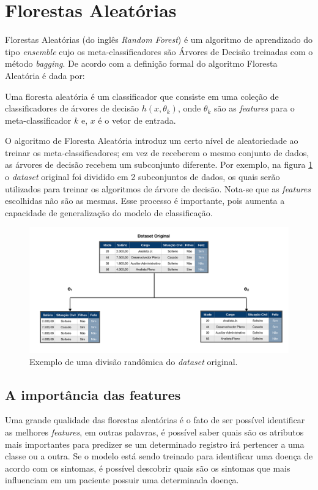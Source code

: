 \section{Florestas Aleatórias}
\label{sec:floresta}
Florestas Aleatórias (do inglês \textit{Random Forest}) é um algoritmo de aprendizado do tipo \textit{ensemble} cujo os meta-classificadores são Árvores de Decisão \cite{Quinlan:1986} treinadas com o método \textit{bagging}.
De acordo com \cite{breiman:2001} a definição formal do algoritmo Floresta Aleatória é dada por:

\begin{definition}\label{def:floresta}
Uma floresta aleatória é um classificador que consiste em uma coleção de classificadores de árvores de decisão ${h(x, \theta _k)}$, onde ${\theta _k}$ são as \textit{features} para o meta-classificador $k$ e, $x$ é o vetor de entrada.
\end{definition}

O algoritmo de Floresta Aleatória introduz um certo nível de aleatoriedade ao treinar os meta-classificadores; em vez de receberem o mesmo conjunto de dados, as árvores de decisão recebem um subconjunto diferente. Por exemplo, na figura \ref{fig:split_floresta} o \textit{dataset} original foi dividido em 2 subconjuntos de dados, os quais serão utilizados para treinar os algoritmos de árvore de decisão. Nota-se que as \textit{features} escolhidas não são as mesmas. Esse processo é importante, pois aumenta a capacidade de generalização do modelo de classificação.

\begin{figure}[h!]
    \centering
    \includegraphics[scale=0.4]{Imagens/split_RandomForest.png}
    \caption{Exemplo de uma divisão randômica do \textit{dataset} original.}
    \label{fig:split_floresta}
\end{figure}

\subsection{A importância das features}
\label{sec:importancia_features}
Uma grande qualidade das florestas aleatórias é o fato de ser possível identificar as melhores \textit{features}, em outras palavras, é possível saber quais são os atributos mais importantes para predizer se um determinado registro irá pertencer a uma classe ou a outra. Se o modelo está sendo treinado para identificar uma doença de acordo com os sintomas, é possível descobrir quais são os sintomas que mais influenciam em um paciente possuir uma determinada doença.


